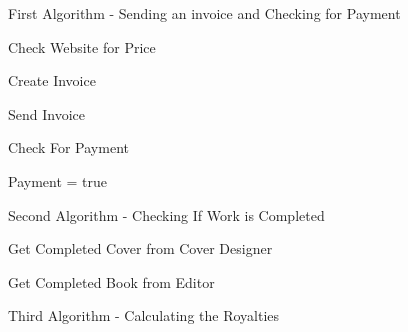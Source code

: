 \begin{algorithm}[H]
    \caption{First Algorithm - Sending an invoice and Checking for Payment}
\begin{algorithmic}[1]
\State


    Check Website for Price

    Create Invoice

    Send Invoice


\EndWhile


     Check For Payment


     	Payment = true

     \EndIf
\EndWhile
\end{algorithmic}
\end{algorithm}


\begin{algorithm}[H]
    \caption{Second Algorithm - Checking If Work is Completed}
\begin{algorithmic}[1]
\State

    
    Get Completed Cover from Cover Designer


    Get Completed Book from Editor




    \EndIf
\EndWhile
\end{algorithmic}
\end{algorithm}

\begin{algorithm}[H]
    \caption{Third Algorithm - Calculating the Royalties}
\begin{algorithmic}[1]


\end{algorithmic}
\end{algorithm}


